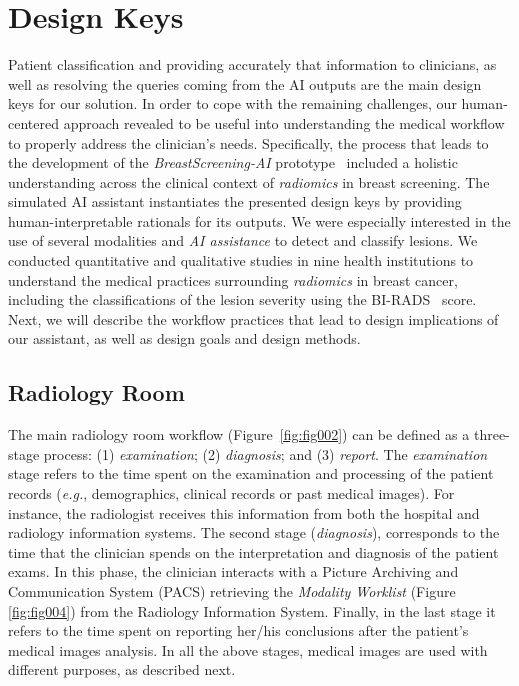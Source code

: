 \section{Design Keys}
\label{sec:environment}

Patient classification and providing accurately that information to clinicians, as well as resolving the queries coming from the AI outputs are the main design keys for our solution.
In order to cope with the remaining challenges, our human-centered approach revealed to be useful into understanding the medical workflow to properly address the clinician's needs.
Specifically, the process that leads to the development of the {\it BreastScreening-AI} prototype~\cite{https://doi.org/10.13140/rg.2.2.29816.70409} included a holistic understanding across the clinical context of {\it radiomics} in breast screening.
The simulated AI assistant instantiates the presented design keys by providing human-interpretable rationals for its outputs.
We were especially interested in the use of several modalities and {\it AI assistance} to detect and classify lesions.
We conducted quantitative and qualitative studies in nine health institutions to understand the medical practices surrounding {\it radiomics} in breast cancer, including the classifications of the lesion severity using the BI-RADS~\cite{https://doi.org/10.13140/rg.2.2.36306.86725} score.
Next, we will describe the workflow practices that lead to design implications of our assistant, as well as design goals and design methods.

\subsection{Radiology Room}

The main radiology room workflow (Figure~\ref{fig:fig002}) can be defined as a three-stage process:
(1) {\it examination};
(2) {\it diagnosis}; and
(3) {\it report}.
The {\it examination} stage refers to the time spent on the examination and processing of the patient records ({\it e.g.}, demographics, clinical records or past medical images).
For instance, the radiologist receives this information from both the hospital and radiology information systems.
The second stage ({\it diagnosis}), corresponds to the time that the clinician spends on the interpretation and diagnosis of the patient exams.
In this phase, the clinician interacts with a Picture Archiving and Communication System (PACS) retrieving the {\it Modality Worklist} (Figure \ref{fig:fig004}) from the Radiology Information System.
Finally, in the last stage it refers to the time spent on reporting her/his conclusions after the patient's medical images analysis.
In all the above stages, medical images are used with different purposes, as described next.

